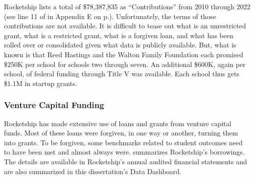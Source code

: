 Rocketship lists a total of \$78,387,835 as ``Contributions'' from 2010 through 2022 (see line 11 of  in Appendix E on p.\pageref{tab:consolidated_activities}). Unfortunately, the terms of those contributions are not available. It is difficult to tease out what is an unrestricted grant, what is a restricted grant, what is a forgiven loan, and what has been rolled over or consolidated given what data is publicly available. But, what is known is that Reed Hastings and the Walton Family Foundation each promised \$250K per school for schools two through seven. An additional \$600K, again per school, of federal funding through Title V was available. Each school thus gets \$1.1M in startup grants.

\subsubsection{Venture Capital Funding}%
\label{sec:venture-capital_funding}\indent%

Rocketship has made extensive use of loans and grants from venture capital funds. Most of these loans were forgiven, in one way or another, turning them into grants. To be forgiven, some benchmarks related to student outcomes need to have been met and almost always were.  summarizes Rocketship's borrowings. The details are available in Rocketship's annual audited financial statements and are also summarized in this dissertation's Data Dashboard.

